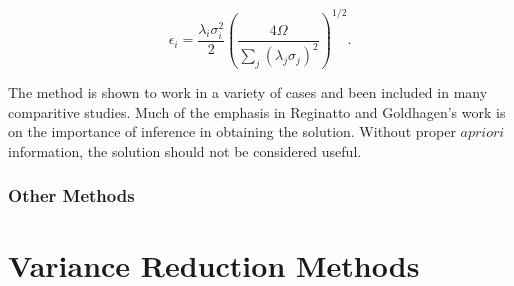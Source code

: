 \begin{equation}\label{eqn:maxed-error}
\epsilon_i = \frac{\lambda_i \sigma_i^2}{2} (\frac{4 \Omega}{\sum_j (\lambda_j \sigma_j)^2})^{1/2} .
\end{equation}

The method is shown to work in a variety of cases and been included in many comparitive studies.
Much of the emphasis in Reginatto and Goldhagen's work is on the importance of inference in obtaining the solution.
Without proper $a priori$ information, the solution should not be considered useful.



\subsubsection{Other Methods}


\section{Variance Reduction Methods}

